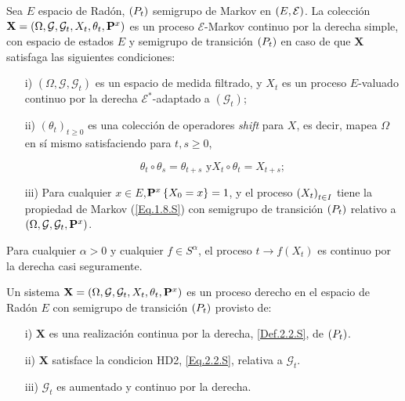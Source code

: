 \begin{Def}\label{Def.2.2.S}
Sea $E$ espacio de Rad\'on, $\left(P_{t}\right)$ semigrupo de Markov en $\left(E,\mathcal{E}\right)$. La
colecci\'on
$\mathbf{X}=\left(\Omega,\mathcal{G},\mathcal{G}_{t},X_{t},\theta_{t},\mathbf{P}^{x}\right)$
es un proceso $\mathcal{E}$-Markov continuo por la derecha simple,
con espacio de estados $E$ y semigrupo de transici\'on $\left(P_{t}\right)$ en
caso de que $\mathbf{X}$ satisfaga las siguientes
condiciones:
\begin{itemize}
\item[i)] $\left(\Omega,\mathcal{G},\mathcal{G}_{t}\right)$ es un
espacio de medida filtrado, y $X_{t}$ es un proceso $E$-valuado
continuo por la derecha $\mathcal{E}^{*}$-adaptado a
$\left(\mathcal{G}_{t}\right)$;

\item[ii)] $\left(\theta_{t}\right)_{t\geq0}$ es una colecci\'on
de operadores {\em shift} para $X$, es decir, mapea $\Omega$ en
s\'i mismo satisfaciendo para $t,s\geq0$,

\begin{equation}\label{Eq.Shift}
\theta_{t}\circ\theta_{s}=\theta_{t+s}\textrm{ y
}X_{t}\circ\theta_{t}=X_{t+s};
\end{equation}

\item[iii)] Para cualquier $x\in E$,$\mathbf{P}^{x}\left\{X_{0}=x\right\}=1$,
y el proceso $\left(X_{t}\right)_{t\in I}$ tiene la propiedad de Markov (\ref{Eq.1.8.S})
con semigrupo de transici\'on $\left(P_{t}\right)$ relativo a
$\left(\Omega,\mathcal{G},\mathcal{G}_{t},\mathbf{P}^{x}\right)$.
\end{itemize}
\end{Def}


\begin{Def}[HD2]\label{Eq.2.2.S}
Para cualquier $\alpha>0$ y cualquier $f\in S^{\alpha}$, el
proceso $t\rightarrow f\left(X_{t}\right)$ es continuo por la
derecha casi seguramente.
\end{Def}

\begin{Def}\label{Def.PD}
Un sistema
$\mathbf{X}=\left(\Omega,\mathcal{G},\mathcal{G}_{t},X_{t},\theta_{t},\mathbf{P}^{x}\right)$
es un proceso derecho en el espacio de Rad\'on $E$ con semigrupo
de transici\'on $\left(P_{t}\right)$ provisto de:
\begin{itemize}
\item[i)] $\mathbf{X}$ es una realizaci\'on  continua por la
derecha, \ref{Def.2.2.S}, de $\left(P_{t}\right)$.

\item[ii)] $\mathbf{X}$ satisface la condicion HD2,
\ref{Eq.2.2.S}, relativa a $\mathcal{G}_{t}$.

\item[iii)] $\mathcal{G}_{t}$ es aumentado y continuo por la
derecha.
\end{itemize}
\end{Def}


